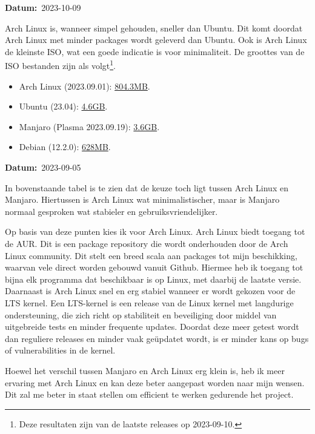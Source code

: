 \documentclass[a4paper]{report}
\newcommand{\timestamp}[1]{
  \mbox{\scriptsize \textbf{Datum:} #1} \smallbreak
}
\begin{document}
\pagebreak 

\timestamp{2023-10-09}
Arch Linux is, wanneer simpel gehouden, sneller dan Ubuntu\cite{archvsubuntureddit}.
Dit komt doordat Arch Linux met minder packages wordt geleverd dan Ubuntu.
Ook is Arch Linux de kleinste ISO, wat een goede indicatie is voor minimaliteit. 
De groottes van de ISO bestanden zijn als volgt\footnote{Deze resultaten zijn van de laatste releases op 2023-09-10.}.
\begin{itemize}
  \item Arch Linux (2023.09.01): \href{https://archlinux.org/download/}{804.3MB}.
  \item Ubuntu (23.04): \href{https://ubuntu.com/download/desktop}{4.6GB}.
  \item Manjaro (Plasma 2023.09.19): \href{https://download.manjaro.org/kde/23.0.2/manjaro-kde-23.0.2-230919-linux65.iso}{3.6GB}.
  \item Debian (12.2.0): \href{https://www.debian.org/distrib/netinst#smallcd}{628MB}.
\end{itemize}

\par\smallskip
\timestamp{2023-09-05}
In bovenstaande tabel is te zien dat de keuze toch ligt tussen Arch Linux en Manjaro.
Hiertussen is Arch Linux wat minimalistischer, maar is Manjaro normaal gesproken wat stabieler en gebruiksvriendelijker. 
\par\smallskip
Op basis van deze punten kies ik voor Arch Linux. 
Arch Linux biedt toegang tot de AUR. Dit is een package repository die wordt onderhouden door de Arch Linux community.
Dit stelt een breed scala aan packages tot mijn beschikking, waarvan vele direct worden gebouwd vanuit Github.
Hiermee heb ik toegang tot bijna elk programma dat beschikbaar is op Linux, met daarbij de laatste versie. 
Daarnaast is Arch Linux snel en erg stabiel wanneer er wordt gekozen voor de LTS kernel\cite{QuickTipsStableArch}.
Een LTS-kernel is een release van de Linux kernel met langdurige ondersteuning, die zich richt op stabiliteit en beveiliging door middel van uitgebreide tests en minder frequente updates.
Doordat deze meer getest wordt dan reguliere releases en minder vaak geüpdatet wordt, is er minder kans op bugs of vulnerabilities in de kernel\cite{enwiki:1177298994}.
\par\smallskip
Hoewel het verschil tussen Manjaro en Arch Linux erg klein is, heb ik meer ervaring met Arch Linux en kan deze beter aangepast worden naar mijn wensen. 
Dit zal me beter in staat stellen om efficient te werken gedurende het project.
\end{document}
